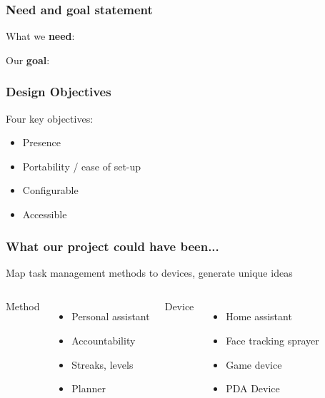 \documentclass{beamer}
\begin{document}
\frame{\titlepage}

\begin{frame}
  \frametitle{Need and goal statement}

  What we
  \textbf{need}:
  
  \newline
  \newline
  Our
  \textbf{goal}:
  

\end{frame}

\begin{frame}
  \frametitle{Design Objectives}

  Four key objectives:
  \begin{itemize}
    \item Presence
    \item Portability / ease of set-up
    \item Configurable
    \item Accessible
  \end{itemize}

\end{frame}

\begin{frame}
  \frametitle{What our project could have been...}

  Map task management methods to devices, generate unique ideas
  \newline
  \newline

  \begin{columns}
    Method
    \begin{itemize}
      \item Personal assistant
      \item Accountability
      \item Streaks, levels
      \item Planner
    \end{itemize}

    Device
    \begin{itemize}
      \item Home assistant
      \item Face tracking sprayer
      \item Game device
      \item PDA Device
    \end{itemize}

  \end{columns}

\end{frame}
\end{document}
